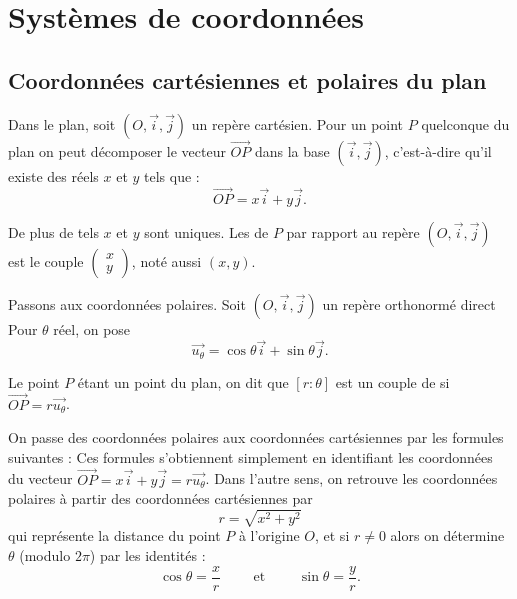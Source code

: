 \documentclass[class=report,crop=false]{standalone}
\newcommand{\vect}{\overrightarrow}
\begin{document}
 



\section{Systèmes de coordonnées}

\subsection{Coordonnées cartésiennes et polaires du plan}

Dans le plan, soit $(O,\vect{i},\vect{j})$ un repère cartésien.
Pour un point $P$ quelconque du plan on peut décomposer le vecteur $\vect{OP}$
dans la base $(\vect{i},\vect{j})$, c'est-à-dire qu'il existe des réels $x$ et $y$ tels que :
$$\vect{OP} = x \vect{i}+y\vect{j}.$$

De plus de tels $x$ et $y$ sont uniques. Les  de $P$ par rapport au
repère $(O,\vect{i},\vect{j})$ est le couple 
$\left(\begin{smallmatrix}x\\y\end{smallmatrix}\right)$, noté aussi
$(x,y)$.



\bigskip

Passons aux coordonnées polaires. 
Soit $(O,\vect{i},\vect{j})$ un repère orthonormé direct
Pour $\theta$ réel, on pose 
$$\vect{u_\theta}=\cos\theta\vect{i}+\sin\theta\vect{j}.$$

Le point $P$ étant un point du plan, on dit que $[r :\theta]$ est un 
couple de  si $\vect{OP}=r\vect{u_\theta}$.



\bigskip

On passe des coordonnées polaires aux coordonnées cartésiennes par les formules suivantes :
Ces formules s'obtiennent simplement en identifiant les coordonnées du vecteur 
$\vect{OP} = x \vect{i}+y\vect{j} = r\vect{u_\theta}$.
Dans l'autre sens, on retrouve les coordonnées polaires à partir des coordonnées cartésiennes
par 
$$r = \sqrt{x^2+y^2}$$
qui représente la distance du point $P$ à l'origine $O$,
et si $r\neq 0$ alors on détermine $\theta$ (modulo $2\pi$) par
les identités :
$$\cos \theta = \frac{x}{r} \qquad\text{ et }\qquad \sin \theta = \frac{y}{r}.$$
\end{document}
